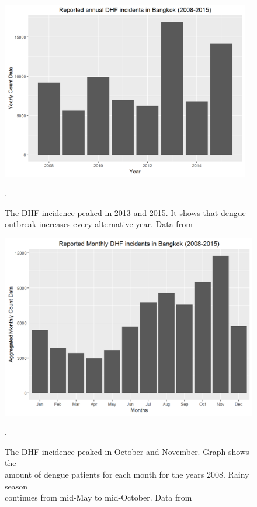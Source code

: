\documentclass{bmcart}
\begin{document}
\begin{figure}[htbp]
	\begin{center}
		\includegraphics[width= 0.97\textwidth]{3-AnuualDengueCases}
		\caption{The DHF incidence peaked in 2013 and 2015. It shows that dengue \\
      outbreak increases every alternative year. Data from \cite{denguethai2015}}.
		\label{figure-AnuualDengueCases}
	\end{center}
\end{figure}

\begin{figure}[htbp]
	\begin{center}
		\includegraphics[width= 1.0\textwidth]{4-MonthlyDengueCases}
		\caption{The DHF incidence peaked in October and November. Graph shows the\\ amount of dengue patients for each month for the years 2008. Rainy season\\ continues from mid-May to mid-October. Data from \cite{denguethai2015}}.
		\label{figure-MonthlyDengueCases}
	\end{center}
\end{figure}
\end{document}

